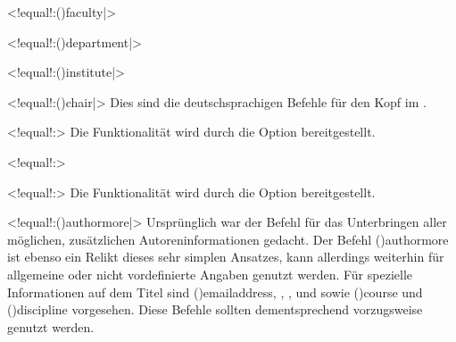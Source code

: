 \begin{DeclareEntity}{}
\begin{NoIndexDefault}
\begin{Declaration}
  {}
  <!equal!:\Macro(){faculty|}>
\begin{Declaration}
  {}
  <!equal!:\Macro(){department|}>
\begin{Declaration}
  {}
  <!equal!:\Macro(){institute|}>
\begin{Declaration}
  {}
  <!equal!:\Macro(){chair|}>
\printdeclarationlist
%
Dies sind die deutschsprachigen Befehle für den Kopf im \CD.
\end{Declaration}
\end{Declaration}
\end{Declaration}
\end{Declaration}

\begin{Declaration}
  {}
  <!equal!:>
\printdeclarationlist
%
Die Funktionalität wird durch die Option  bereitgestellt.
\end{Declaration}

\begin{Declaration}
  {}
  <!equal!:>
\begin{Declaration}
  {}
  <!equal!:>
\printdeclarationlist
%
Die Funktionalität wird durch die Option  bereitgestellt.
\end{Declaration}
\end{Declaration}

\begin{Declaration}
  {}
  <!equal!:\Macro(){authormore|}>
\printdeclarationlist
%
Ursprünglich war der Befehl für das Unterbringen aller möglichen, zusätzlichen 
Autoreninformationen gedacht. Der Befehl \Macro(){authormore} 
ist ebenso ein Relikt dieses sehr simplen Ansatzes, kann allerdings weiterhin 
für allgemeine oder nicht vordefinierte Angaben genutzt werden. Für spezielle 
Informationen auf dem Titel sind \Macro(){emailaddress}, 
, ,  
und  sowie \Macro(){course} und 
\Macro(){discipline} vorgesehen. Diese Befehle sollten 
dementsprechend vorzugsweise genutzt werden.
\end{Declaration}


\end{NoIndexDefault}
\end{DeclareEntity}
